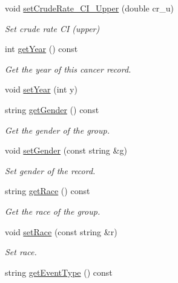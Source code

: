 \begin{DoxyCompactItemize}
\item 
void \mbox{\hyperlink{classbridges_1_1dataset_1_1_cancer_incidence_a9fa8b9c9fc4874e45d21612c817ed394}{set\+Crude\+Rate\+\_\+\+C\+I\+\_\+\+Upper}} (double cr\+\_\+u)
\begin{DoxyCompactList}\small\item\em Set crude rate CI (upper) \end{DoxyCompactList}\item 
int \mbox{\hyperlink{classbridges_1_1dataset_1_1_cancer_incidence_a106905192829e115ed5e1f911d4c8c08}{get\+Year}} () const
\begin{DoxyCompactList}\small\item\em Get the year of this cancer record. \end{DoxyCompactList}\item 
void \mbox{\hyperlink{classbridges_1_1dataset_1_1_cancer_incidence_a833ce8f785d61a5271a2ef949ed76680}{set\+Year}} (int y)
\item 
string \mbox{\hyperlink{classbridges_1_1dataset_1_1_cancer_incidence_a0c4dcbde0ad1f81ffe4016c12d08c4c1}{get\+Gender}} () const
\begin{DoxyCompactList}\small\item\em Get the gender of the group. \end{DoxyCompactList}\item 
void \mbox{\hyperlink{classbridges_1_1dataset_1_1_cancer_incidence_aaf7aa19ce1946af9443e1584e5998e7b}{set\+Gender}} (const string \&g)
\begin{DoxyCompactList}\small\item\em Set gender of the record. \end{DoxyCompactList}\item 
string \mbox{\hyperlink{classbridges_1_1dataset_1_1_cancer_incidence_aacbcdf37d86455d9cbd2a50e9370625e}{get\+Race}} () const
\begin{DoxyCompactList}\small\item\em Get the race of the group. \end{DoxyCompactList}\item 
void \mbox{\hyperlink{classbridges_1_1dataset_1_1_cancer_incidence_ac19844df029b7dc4595205e9660d53e2}{set\+Race}} (const string \&r)
\begin{DoxyCompactList}\small\item\em Set race. \end{DoxyCompactList}\item 
string \mbox{\hyperlink{classbridges_1_1dataset_1_1_cancer_incidence_a964d0fcc125808e457b1fd2f79cf43bf}{get\+Event\+Type}} () const

\end{DoxyCompactItemize}
